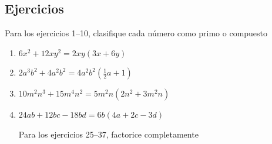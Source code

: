 \documentclass[10pt,twoside]{article}
\begin{document}
\subsection*{Ejercicios}
Para los ejercicios 1--10, clasifique cada número como primo o compuesto
\begin{enumerate}
Para los problemas 11--20, factorice cada número compuesto como producto de números primos. Por ejemplo, $30=2\cdot 3 \cdot 5$
Para los problemas 21--24, determine si el polinomio está completamente factorizado
\item $6x^{2}+12xy^{2}=2xy(3x+6y)$
\item $2a^{3}b^{2}+4a^{2}b^{2}=4a^{2}b^{2}\left(\frac{1}{2}a+1\right)$
\item $10m^{2}n^{3}+15m^{4}n^{2}=5m^{2}n(2n^{2}+3m^{2}n)$
\item $24ab+12bc-18bd=6b(4a+2c-3d)$

Para los ejercicios 25--37, factorice completamente


\end{enumerate}
\end{document}
